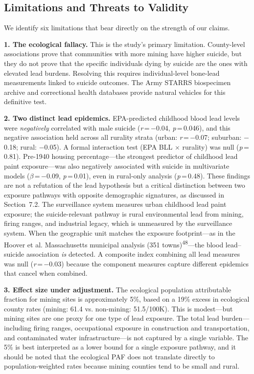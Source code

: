 \documentclass[11pt,twocolumn]{article}
\begin{document}
\subsection{Limitations and Threats to Validity}

We identify six limitations that bear directly on the strength of our claims.

\textbf{1. The ecological fallacy.} This is the study's primary limitation. County-level associations prove that communities with more mining have higher suicide, but they do not prove that the specific individuals dying by suicide are the ones with elevated lead burdens. Resolving this requires individual-level bone-lead measurements linked to suicide outcomes. The Army STARRS biospecimen archive and correctional health databases provide natural vehicles for this definitive test.

\textbf{2. Two distinct lead epidemics.} EPA-predicted childhood blood lead levels were \textit{negatively} correlated with male suicide (\textit{r}\,=\,$-$0.04, \textit{p}\,=\,0.046), and this negative association held across all rurality strata (urban: \textit{r}\,=\,$-$0.07; suburban: $-$0.18; rural: $-$0.05). A formal interaction test (EPA BLL $\times$ rurality) was null (\textit{p}\,=\,0.81). Pre-1940 housing percentage---the strongest predictor of childhood lead paint exposure---was also negatively associated with suicide in multivariate models ($\beta$\,=\,$-$0.09, \textit{p}\,=\,0.01), even in rural-only analysis (\textit{p}\,=\,0.48). These findings are not a refutation of the lead hypothesis but a critical distinction between two exposure pathways with opposite demographic signatures, as discussed in Section~7.2. The surveillance system measures urban childhood lead paint exposure; the suicide-relevant pathway is rural environmental lead from mining, firing ranges, and industrial legacy, which is unmeasured by the surveillance system. When the geographic unit matches the exposure footprint---as in the Hoover et al. Massachusetts municipal analysis (351 towns)\textsuperscript{48}---the blood lead--suicide association \textit{is} detected. A composite index combining all lead measures was null (\textit{r}\,=\,$-$0.03) because the component measures capture different epidemics that cancel when combined.

\textbf{3. Effect size under adjustment.} The ecological population attributable fraction for mining sites is approximately 5\%, based on a 19\% excess in ecological county rates (mining: 61.4 vs. non-mining: 51.5/100K). This is modest---but mining sites are one proxy for one type of lead exposure. The total lead burden---including firing ranges, occupational exposure in construction and transportation, and contaminated water infrastructure---is not captured by a single variable. The 5\% is best interpreted as a lower bound for a single exposure pathway, and it should be noted that the ecological PAF does not translate directly to population-weighted rates because mining counties tend to be small and rural.
\end{document}
